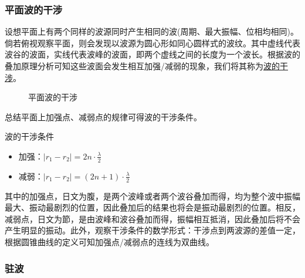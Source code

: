 \subsubsection{平面波的干涉}

设想平面上有两个同样的波源同时产生相同的波(周期、最大振幅、位相均相同)。倘若俯视观察平面，则会发现以波源为圆心形如同心圆样式的波纹。其中虚线代表波谷的波面，实线代表波峰的波面，即两个虚线之间的长度为一个波长。根据波的叠加原理分析可知这些波面会发生相互加强/减弱的现象，我们将其称为\underline{波的干涉}。
\begin{figure}[ht!]
    \centering
    \caption{平面波的干涉}
\end{figure}
总结平面上加强点、减弱点的规律可得波的干涉条件。
\begin{itembox}[l]{波的干涉条件}
    \begin{itemize}
        \item 加强：$|r_1-r_2|=2n\cdot\frac{\lambda}{2}$
        \item 减弱：$|r_1-r_2|=(2n+1)\cdot\frac{\lambda}{2}$
    \end{itemize}
\end{itembox}
其中的加强点，日文为腹，是两个波峰或者两个波谷叠加而得，均为整个波中振幅最大、振动最剧烈的位置，因此叠加后的结果也将会是振动最剧烈的位置。相反，减弱点，日文为節，是由波峰和波谷叠加而得，振幅相互抵消，因此叠加后将不会产生明显的振动。此外，观察干涉条件的数学形式：干涉点到两波源的差值一定，根据圆锥曲线的定义可知加强点/减弱点的连线为双曲线。

\subsubsection{驻波}

